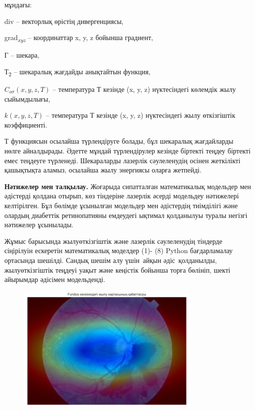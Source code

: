 мұндағы:

div -- векторлық өрістің дивергенциясы,

grad\emph{\textsubscript{xyz}} -- координаттар x, y, z бойынша градиент,

Г -- шекара,

Т\textsubscript{2} -- шекаралық жағдайды анықтайтын функция,

\(C_{o\sigma}(x,y,z,T)\) -- температура Т кезінде (x, y, z) нүктесіндегі
көлемдік жылу сыйымдылығы,

\(k(x,y,z,T)\) -- температура Т кезінде (x, y, z) нүктесіндегі жылу
өткізгіштік коэффициенті.

Т функциясын осылайша түрлендіруге болады, бұл шекаралық жағдайларды
нөлге айналдырады. Әдетте мұндай түрлендірулер кезінде біртекті теңдеу
біртекті емес теңдеуге түрленеді. Шекараларды лазерлік сәулеленудің
осінен жеткілікті қашықтықта аламыз, осылайша жылу энергиясы оларға
жетпейді.

{\bfseries Нәтижелер мен талқылау.} Жоғарыда сипатталған математикалық
модельдер мен әдістерді қолдана отырып, көз тіндеріне лазерлік әсерді
модельдеу нәтижелері келтірілген. Бұл бөлімде ұсынылған модельдер мен
әдістердің тиімділігі және олардың диабеттік ретинопатияны емдеудегі
ықтимал қолданылуы туралы негізгі нәтижелер ұсынылады.

Жұмыс барысында жылуөткізгіштік және лазерлік сәулеленудің тіндерде
сіңірілуін ескеретін математикалық моделдер (1)- (8) Python
бағдарламалау ортасында шешілді. Сандық шешім алу үшін~айқын
әдіс~қолданылды, жылуөткізгіштік теңдеуі уақыт және кеңістік бойынша
торға бөлініп, шекті айырымдар әдісімен модельденді.


\begin{figure}[H]
	\centering
	\includegraphics[width=0.8\textwidth]{media/ict/image20}
	\caption*{}
\end{figure}


